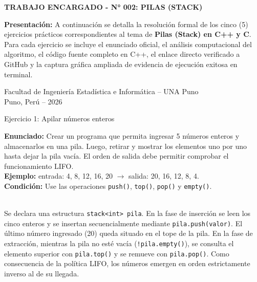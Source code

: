 \documentclass[11pt, a4paper]{article}
\begin{document}
\vspace{5mm}
\begin{center}
{\Large\textbf{\color{azulunap} TRABAJO ENCARGADO - N° 002: PILAS (STACK)}}
\end{center}
\vspace{2mm}

\noindent\textbf{Presentación:} A continuación se detalla la resolución formal de los cinco (5) ejercicios prácticos correspondientes al tema de \textbf{Pilas (Stack) en C++ y C}. Para cada ejercicio se incluye el enunciado oficial, el análisis computacional del algoritmo, el código fuente completo en C++, el enlace directo verificado a GitHub y la captura gráfica ampliada de evidencia de ejecución exitosa en terminal.

\vfill
\begin{center}
    \small\color{black!60}
    Facultad de Ingeniería Estadística e Informática -- UNA Puno\\
    Puno, Perú -- 2026
\end{center}

\newpage

\begin{tcolorbox}[colback=azulunap, colframe=azulunap, coltext=white, fontupper=\large\bfseries, arc=2mm, top=2mm, bottom=2mm]
Ejercicio 1: Apilar números enteros
\end{tcolorbox}

\begin{tcolorbox}[colback=fondocaja, colframe=azulborde, leftrule=3mm, arc=1mm, boxrule=0.5pt, top=2mm, bottom=2mm]
\textbf{Enunciado:} Crear un programa que permita ingresar 5 números enteros y almacenarlos en una pila. Luego, retirar y mostrar los elementos uno por uno hasta dejar la pila vacía. El orden de salida debe permitir comprobar el funcionamiento LIFO.\\
\textbf{Ejemplo:} entrada: 4, 8, 12, 16, 20 $\rightarrow$ salida: 20, 16, 12, 8, 4.\\
\textbf{Condición:} Use las operaciones \texttt{push()}, \texttt{top()}, \texttt{pop()} y \texttt{empty()}.
\end{tcolorbox}

\vspace{1mm}
\\
{\small Se declara una estructura \texttt{stack<int> pila}. En la fase de inserción se leen los cinco enteros y se insertan secuencialmente mediante \texttt{pila.push(valor)}. El último número ingresado (20) queda situado en el tope de la pila. En la fase de extracción, mientras la pila no esté vacía (\texttt{!pila.empty()}), se consulta el elemento superior con \texttt{pila.top()} y se remueve con \texttt{pila.pop()}. Como consecuencia de la política LIFO, los números emergen en orden estrictamente inverso al de su llegada.}
\end{document}

